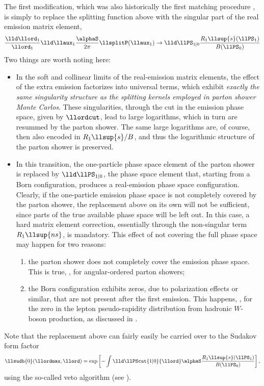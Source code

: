 The first modification, which was also historically the first matching
procedure \cite{Bengtsson:1986hr}, is simply to replace the splitting
function above with the singular part of the real emission matrix
element,
\begin{equation}
  \label{eq:matching:first}
  \frac{\lld\llord_1}{\llord_1}
  \lld\llaux_1\frac{\alphaS}{2\pi}\llsplitP(\llaux_1)\rightarrow
  \lld\llPS_{1|0}\frac{R_1\llsup{s}(\llPS_1)}{B(\llPS_0)}
\end{equation}
Two things are worth noting here:
\begin{itemize}
\item In the soft and collinear limits of the real-emission matrix
  elements, the effect of the extra emission factorizes into universal
  terms, which exhibit {\em exactly the same singularity structure as
    the splitting kernels employed in parton shower Monte Carlos}.
  These singularities, through the cut in the emission phase space,
  given by $\llordcut$, lead to large logarithms, which in turn are
  resummed by the parton shower.  The same large logarithms are, of
  course, then also encoded in $R_1\llsup{s}/B$, and thus the
  logarithmic structure of the parton shower is preserved.
\item In this transition, the one-particle phase space element of the
  parton shower is replaced by $\lld\llPS_{1|0}$, the phase space
  element that, starting from a Born configuration, produces a
  real-emission phase space configuration.  Clearly, if the
  one-particle emission phase space is not completely covered by the
  parton shower, the replacement above on its own will not be
  sufficient, since parts of the true available phase space will be
  left out.  In this case, a hard matrix element correction,
  essentially through the non-singular term $R_1\llsup{ns}$, is
  mandatory.  This effect of not covering the full phase space may
  happen for two reasons:
  \begin{enumerate}
  \item the parton shower does not completely cover the emission phase
    space.  This is true, \eg, for angular-ordered parton showers;
  \item the Born configuration exhibits zeros, due to polarization
    effects or similar, that are not present after the first emission.
    This happens, \eg, for the zero in the lepton pseudo-rapidity distribution from
    hadronic $W$-boson production, as discussed in
    \cite{Alioli:2008gx}.
  \end{enumerate}
\end{itemize}
Note that the replacement above can fairly easily be carried over to
the Sudakov form factor
\begin{equation}
  \label{eq:matching:sudcorr}
  \llsudb{0}(\llordmax,\llord)=
  \exp\left[-\int\lld\llPScut{1|0}{\llord}\alphaS
    \frac{R_1\llsup{s}(\llPS_1)}{B(\llPS_0)}\right],
\end{equation}
using the so-called veto algorithm (see ).

